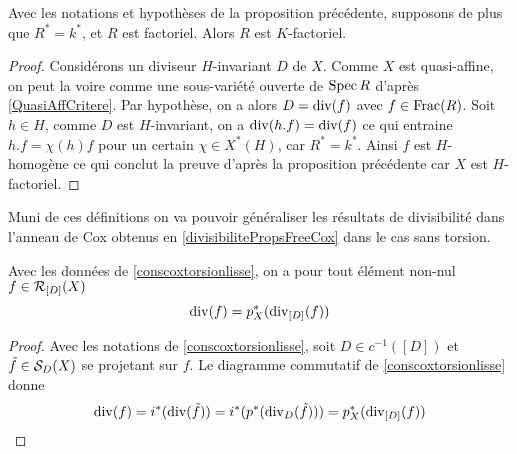 \begin{cor}
Avec les notations et hypothèses de la proposition précédente, supposons de plus que $R^*=k^*$, et $R$ est factoriel. Alors $R$ est $K$-factoriel.
\end{cor}
\begin{proof}
Considérons un diviseur $H$-invariant $D$ de $X$. Comme $X$ est quasi-affine, on peut la voire comme une sous-variété ouverte de $\operatorname{Spec} R$ d'après \ref{QuasiAffCritere}. Par hypothèse, on a alors $D=\operatorname{div}(f)$ avec $f\in \operatorname{Frac}(R)$. Soit $h\in H$, comme $D$ est $H$-invariant, on a $\operatorname{div}(h.f)=\operatorname{div}(f)$ ce qui entraine $h.f=\chi(h)f$ pour un certain $\chi\in X^*(H)$, car $R^*=k^*$. Ainsi $f$ est $H$-homogène ce qui conclut la preuve d'après la proposition précédente car $X$ est $H$-factoriel.
\end{proof}

Muni de ces définitions on va pouvoir généraliser les résultats de divisibilité dans l'anneau de Cox obtenus en \ref{divisibilitePropsFreeCox} dans le cas sans torsion.

\begin{lem}
Avec les données de \ref{conscoxtorsionlisse}, on a pour tout élément non-nul $f\in \mathcal{R}_{[D]}(X)$
$$\operatorname{div}(f)=p^*_X(\operatorname{div}_{[D]}(f))$$
\end{lem}
\begin{proof}
Avec les notations de \ref{conscoxtorsionlisse}, soit $D\in c^{-1}([D])$ et $\tilde{f}\in\mathcal{S}_D(X)$ se projetant sur $f$. Le diagramme commutatif de \ref{conscoxtorsionlisse} donne
$$\operatorname{div}(f)=i^*(\operatorname{div}(\tilde{f}))=i^*(p^*(\operatorname{div}_D(\tilde{f})))=p_X^*(\operatorname{div}_{[D]}(f))$$
\end{proof}

